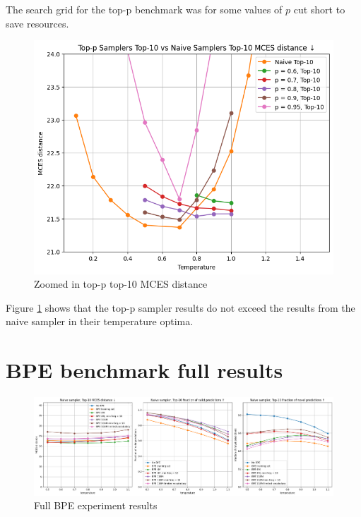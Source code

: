 The search grid for the top-p benchmark was for some values of $p$ cut short to save resources.

\begin{figure}[h]
    \centering
    \includegraphics[width=0.6\linewidth]{figures/appendix/samplers/top-p_vs_naive_top-10.png}
    \caption{Zoomed in top-p top-10 MCES distance}
    \label{fig:top-p_zoomed_appendix}
\end{figure}

Figure \ref{fig:top-p_zoomed_appendix} shows that the top-p sampler results do not exceed the results from the naive sampler in their temperature optima.


\section{BPE benchmark full results}
\label{sec:bpe_appendix}

\begin{figure}[h]
    \centering
    \includegraphics[width=1.0\textwidth]{figures/appendix/bpe.png}
    \caption{Full BPE experiment results}
    \label{fig:bpe_appendix}
\end{figure}
